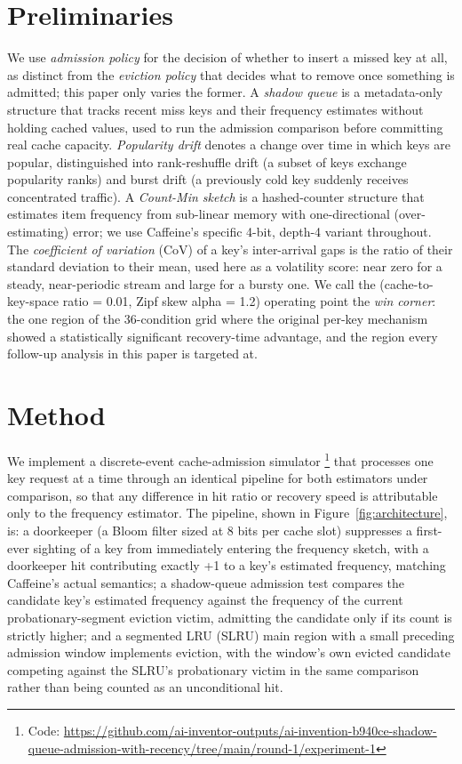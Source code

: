 \documentclass[11pt,letterpaper]{article}
\begin{document}
\section{Preliminaries}

We use \emph{admission policy} for the decision of whether to insert a missed key at all, as distinct from the \emph{eviction policy} that decides what to remove once something is admitted; this paper only varies the former. A \emph{shadow queue} is a metadata-only structure that tracks recent miss keys and their frequency estimates without holding cached values, used to run the admission comparison before committing real cache capacity. \emph{Popularity drift} denotes a change over time in which keys are popular, distinguished into rank-reshuffle drift (a subset of keys exchange popularity ranks) and burst drift (a previously cold key suddenly receives concentrated traffic). A \emph{Count-Min sketch} is a hashed-counter structure that estimates item frequency from sub-linear memory with one-directional (over-estimating) error; we use Caffeine's specific 4-bit, depth-4 variant throughout. The \emph{coefficient of variation} (CoV) of a key's inter-arrival gaps is the ratio of their standard deviation to their mean, used here as a volatility score: near zero for a steady, near-periodic stream and large for a bursty one. We call the (cache-to-key-space ratio = 0.01, Zipf skew alpha = 1.2) operating point the \emph{win corner}: the one region of the 36-condition grid where the original per-key mechanism showed a statistically significant recovery-time advantage, and the region every follow-up analysis in this paper is targeted at.

\section{Method}

We implement a discrete-event cache-admission simulator \footnote{Code: \url{https://github.com/ai-inventor-outputs/ai-invention-b940ce-shadow-queue-admission-with-recency/tree/main/round-1/experiment-1}} that processes one key request at a time through an identical pipeline for both estimators under comparison, so that any difference in hit ratio or recovery speed is attributable only to the frequency estimator. The pipeline, shown in Figure~\ref{fig:architecture}, is: a doorkeeper (a Bloom filter sized at 8 bits per cache slot) suppresses a first-ever sighting of a key from immediately entering the frequency sketch, with a doorkeeper hit contributing exactly +1 to a key's estimated frequency, matching Caffeine's actual semantics; a shadow-queue admission test compares the candidate key's estimated frequency against the frequency of the current probationary-segment eviction victim, admitting the candidate only if its count is strictly higher; and a segmented LRU (SLRU) main region with a small preceding admission window implements eviction, with the window's own evicted candidate competing against the SLRU's probationary victim in the same comparison rather than being counted as an unconditional hit.
\end{document}
